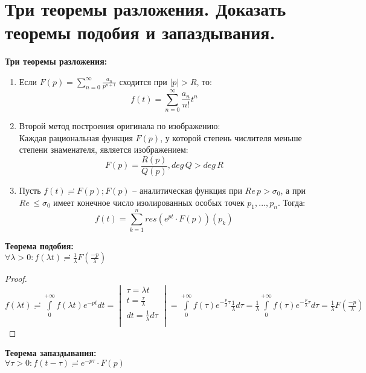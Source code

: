 \newpage
\section{Три теоремы разложения. Доказать теоремы подобия и запаздывания.}

\textbf{Три теоремы разложения:}
\begin{enumerate}
    \item Если $F(p) = \sum_{n=0}^\infty\frac{a_n}{p^{n+1}}$ сходится при $|p|>R$, то:
    $$f(t)=\sum_{n=0}^\infty\frac{a_n}{n!}t^n$$
    \item Второй метод построения оригинала по изображению:\\
    Каждая рациональная функция $F(p)$, у которой степень числителя меньше степени знаменателя, является изображением:
    $$F(p)=\frac{R(p)}{Q(p)}, deg\,Q>deg\,R$$
    \item Пусть $f(t)\risingdotseq F(p); F(p)$ -- аналитическая функция при $Re\,p>\sigma_0$, а при $Re\,\leq \sigma_0$ имеет конечное число изолированных особых точек $p_1, ..., p_n$. Тогда:
    $$f(t)=\sum_{k=1}^{n}res(e^{pt}\cdot F(p))(p_k)$$
\end{enumerate}

\textbf{Теорема подобия:}\\
$\forall \lambda > 0: f(\lambda t) \risingdotseq \frac{1}{\lambda} F\left(\frac{-p}{\lambda}\right)$

\begin{proof}
    \ \\
    $f(\lambda t)\risingdotseq \int\limits_{0}^{+\infty}f(\lambda t)e^{-pt}dt =
    \begin{vmatrix}
        \tau=\lambda t\\
        t=\frac{\tau}{\lambda}\\
        dt=\frac{1}{\lambda}d\tau\\
    \end{vmatrix}
    = \int\limits_0^{+\infty} f(\tau)e^{-\frac{p}{\lambda}\tau}\frac{1}{\lambda}d\tau = \frac{1}{\lambda}\int\limits_0^{+\infty}f(\tau)e^{-\frac{p}{\lambda}\tau}d\tau=\frac{1}{\lambda} F\left(\frac{-p}{\lambda}\right)$
\end{proof}

\textbf{Теорема запаздывания:}\\
$\forall \tau > 0: f(t-\tau) \risingdotseq e^{-p\tau}\cdot F(p)$
    
